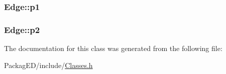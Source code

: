 \subsubsection[{\texorpdfstring{p1}{p1}}]{ Edge\+::p1}\hypertarget{class_edge_a9cb958550d6ca42fd7122235d64898c9}{}\label{class_edge_a9cb958550d6ca42fd7122235d64898c9}
\subsubsection[{\texorpdfstring{p2}{p2}}]{ Edge\+::p2}\hypertarget{class_edge_a0867d7b428491ef61eb90b540a73db1d}{}\label{class_edge_a0867d7b428491ef61eb90b540a73db1d}


The documentation for this class was generated from the following file\+:\begin{DoxyCompactItemize}
\item 
Packag\+E\+D/include/\hyperlink{_classes_8h}{Classes.\+h}\end{DoxyCompactItemize}
